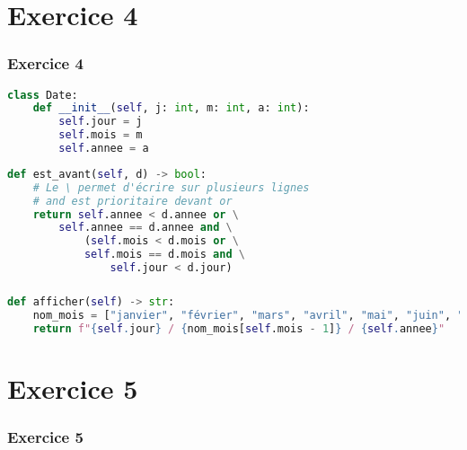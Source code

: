\documentclass[svgnames,11pt]{beamer}
\begin{document}
\section{Exercice 4}
\begin{frame}[fragile]
    \frametitle{Exercice 4}
\begin{center}
\begin{lstlisting}[language=Python , basicstyle=\ttfamily\small, xleftmargin=1em, xrightmargin=1em]
class Date:
    def __init__(self, j: int, m: int, a: int):
        self.jour = j
        self.mois = m
        self.annee = a
\end{lstlisting}
\end{center}
\end{frame}
\begin{frame}[fragile]
\begin{center}
\begin{lstlisting}[language=Python , basicstyle=\ttfamily\small, xleftmargin=2em, xrightmargin=2em]
def est_avant(self, d) -> bool:
    # Le \ permet d'écrire sur plusieurs lignes
    # and est prioritaire devant or
    return self.annee < d.annee or \
        self.annee == d.annee and \
            (self.mois < d.mois or \
            self.mois == d.mois and \
                self.jour < d.jour)
\end{lstlisting}
\end{center}

\end{frame}
\begin{frame}[fragile]
    \frametitle{}

\begin{center}
\begin{lstlisting}[language=Python , basicstyle=\ttfamily\small, xleftmargin=2em, xrightmargin=2em]
def afficher(self) -> str:
    nom_mois = ["janvier", "février", "mars", "avril", "mai", "juin", "juillet", "août", "septembre", "octobre", "novembre", "décembre"]
    return f"{self.jour} / {nom_mois[self.mois - 1]} / {self.annee}"

\end{lstlisting}
\end{center}

\end{frame}
\section{Exercice 5}
\begin{frame}
    \frametitle{Exercice 5}


\end{frame}
\begin{frame}


\end{frame}
\begin{frame}


\end{frame}
\end{document}
